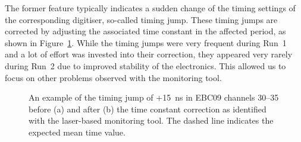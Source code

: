 The former feature typically indicates a sudden change of the timing settings of
the corresponding digitiser, so-called timing jump. These timing jumps
are corrected by adjusting the associated time constant in the affected
period, as shown in Figure~\ref{fig:timing_jump}.
%
While the timing jumps were very frequent during
Run~1~\cite{bib:laser_run_1} and a lot of effort was invested into their 
correction, they appeared very rarely during Run~2 due
to improved stability of the electronics. This allowed us to focus on
other problems observed with the monitoring tool.

\begin{figure}[htbp]
\centering
    \caption{An example of the timing jump of +15~ns in EBC09
    channels 30--35 before (a) and after (b) the time constant
    correction as identified with the laser-based monitoring tool. The
    dashed line indicates the expected mean time value.}
    \label{fig:timing_jump}
\end{figure}


